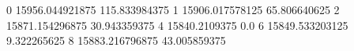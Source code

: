 0 15956.044921875 115.833984375
1 15906.017578125 65.806640625
2 15871.154296875 30.943359375
4 15840.2109375 0.0
6 15849.533203125 9.322265625
8 15883.216796875 43.005859375
